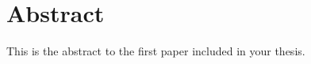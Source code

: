 \newpage
\section*{Abstract}
This is the abstract to the first paper included in your thesis.
\newpage